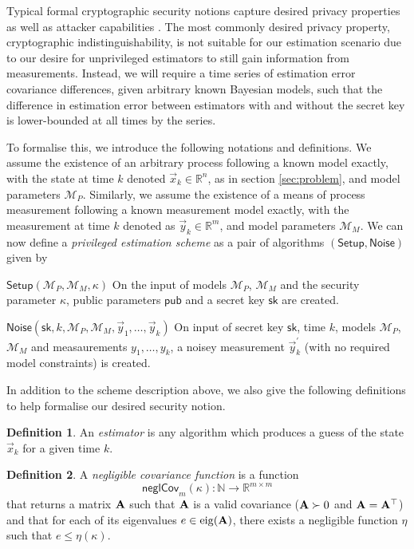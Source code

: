 \documentclass[conference]{IEEEtran}
\theoremstyle{definition}
\newtheorem{definition}{Definition}[section]
\theoremstyle{definition}
\theoremstyle{remark}
\begin{document}
Typical formal cryptographic security notions capture desired privacy properties as well as attacker capabilities \cite{katzIntroductionModernCryptography2008}. The most commonly desired privacy property, cryptographic indistinguishability, is not suitable for our estimation scenario due to our desire for unprivileged estimators to still gain  information from measurements. Instead, we will require a time series of estimation error covariance differences, given arbitrary known Bayesian models, such that the difference in estimation error between estimators with and without the secret key is lower-bounded at all times by the series.

To formalise this, we introduce the following notations and definitions. We assume the existence of an arbitrary process following a known model exactly, with the state at time $k$ denoted $\vec{x}_k\in\mathbb{R}^n$, as in section \ref{sec:problem}, and model parameters $\mathcal{M}_P$. Similarly, we assume the existence of a means of process measurement following a known measurement model exactly, with the measurement at time $k$ denoted as $\vec{y}_k\in\mathbb{R}^m$, and model parameters $\mathcal{M}_M$. We can now define a \textit{privileged estimation scheme} as a pair of algorithms $(\mathsf{Setup},\mathsf{Noise})$ given by
\begin{LaTeXdescription}
   \item[$\mathsf{Setup}(\mathcal{M}_P, \mathcal{M}_M, \kappa)$] On the input of models $\mathcal{M}_P$, $\mathcal{M}_M$ and the security parameter $\kappa$, public parameters $\mathsf{pub}$ and a secret key $\mathsf{sk}$ are created.
   \item[$\mathsf{Noise}(\mathsf{sk}, k, \mathcal{M}_P, \mathcal{M}_M, \vec{y}_1, \dots, \vec{y}_k)$] On input of secret key $\mathsf{sk}$, time $k$, models $\mathcal{M}_P$, $\mathcal{M}_M$ and measaurements $y_1,\dots,y_k$, a noisey measurement $\vec{y}^\prime_k$ (with no required model constraints) is created.
\end{LaTeXdescription}
In addition to the scheme description above, we also give the following definitions to help formalise our desired security notion.
\begin{definition}\label{def:estimator}
   An \textit{estimator} is any algorithm which produces a guess of the state $\vec{x}_k$ for a given time $k$.
\end{definition}
\begin{definition}
   A \textit{negligible covariance function} is a function 
   \begin{equation}
      \mathsf{neglCov}_m(\kappa):\mathbb{N}\rightarrow \mathbb{R}^{m\times m}
   \end{equation}
   that returns a matrix ${{\mathbf{A}}}$ such that ${{\mathbf{A}}}$ is a valid covariance (${{\mathbf{A}}}\succ 0$ and ${{\mathbf{A}}}={{\mathbf{A}}}^\top$) and that for each of its eigenvalues $e\in\operatorfont{eig}(\mat{A})$, there exists a negligible function $\eta$ such that $e\leq\eta(\kappa)$.
\end{definition}
\end{document}
